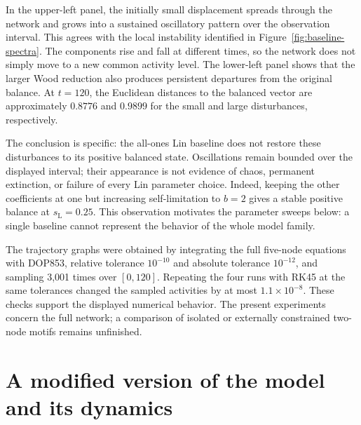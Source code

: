 \documentclass{article}
\begin{document}
In the upper-left panel, the initially small displacement spreads through
the network and grows into a sustained oscillatory pattern over the
observation interval. This agrees with the local instability identified
in Figure~\ref{fig:baseline-spectra}. The components rise and fall at
different times, so the network does not simply move to a new common
activity level. The lower-left panel shows that the larger Wood reduction
also produces persistent departures from the original balance. At $t=120$,
the Euclidean distances to the balanced vector are approximately $0.8776$
and $0.9899$ for the small and large disturbances, respectively.

The conclusion is specific: the all-ones Lin baseline does not restore
these disturbances to its positive balanced state. Oscillations remain
bounded over the displayed interval; their appearance is not evidence of
chaos, permanent extinction, or failure of every Lin parameter choice.
Indeed, keeping the other coefficients at one but increasing self-limitation
to $b=2$ gives a stable positive balance at $s_{\mathrm L}=0.25$.
This observation motivates the parameter sweeps below: a single baseline
cannot represent the behavior of the whole model family.

The trajectory graphs were obtained by integrating the full five-node
equations with DOP853, relative tolerance $10^{-10}$ and absolute tolerance
$10^{-12}$, and sampling 3,001 times over $[0,120]$. Repeating the four
runs with RK45 at the same tolerances changed the sampled activities by
at most $1.1\times10^{-8}$. These checks support the displayed numerical
behavior. The present experiments concern the full network; a comparison
of isolated or externally constrained two-node motifs remains unfinished.

\FloatBarrier
\section{A modified version of the model and its dynamics}
\label{sec:modified-results}
\end{document}

